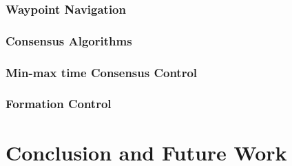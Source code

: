 \documentclass[letterpaper, 10 pt, conference]{ieeeconf}
\begin{document}
\subsubsection{Waypoint Navigation}
\subsubsection{Consensus Algorithms}
\subsubsection{Min-max time Consensus Control}
\subsubsection{Formation Control}


\section{Conclusion and Future Work} \label{sec:conc}





\end{document}
